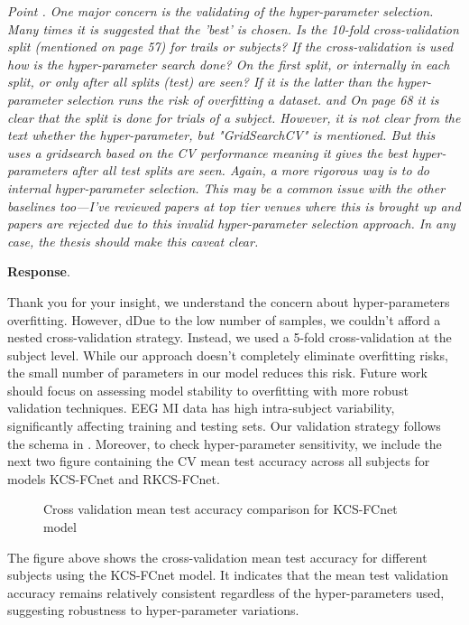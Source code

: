 \documentclass[runningheads]{llncs}
\newenvironment{reviewer}{\setcounter{pointcounter}{1}}{}
\newcommand{\point}[1]{\medskip \noindent
  \textsl{{\fontseries{b}\selectfont Point \thepointcounter}.
\stepcounter{pointcounter} #1}}
\newcommand{\reply}{\medskip \noindent \textbf{Response}.\ }
\begin{document}
\begin{reviewer}
  \point{One major concern is the validating of the hyper-parameter
    selection. Many times it is suggested that the 'best' is chosen. Is
    the 10-fold cross-validation split (mentioned on page 57) for
    trails or subjects? If the cross-validation is used how is the
    hyper-parameter search done? On the first split, or internally in
    each split, or only after all splits (test) are seen? If it is the
    latter than the hyper-parameter selection runs the risk of
    overfitting a dataset. and On page 68 it is clear that the split is
    done for trials of a subject.  However, it is not clear from the
    text whether the hyper-parameter, but "GridSearchCV" is mentioned.
    But this uses a gridsearch based on the CV performance meaning it
    gives the best hyper-parameters after all test splits are seen.
    Again, a more rigorous way is to do internal hyper-parameter
    selection. This may be a common issue with the other baselines
    too—I've reviewed papers at top tier venues where this is brought
    up and papers are rejected due to this invalid hyper-parameter
  selection approach.  In any case, the thesis should make this caveat clear.}

  \reply{Thank you for your insight, we understand the concern about
    hyper-parameters overfitting. However, dDue to the low number of
    samples, we couldn't afford a nested cross-validation strategy.
    Instead, we used a 5-fold cross-validation at the subject level.
    While our approach doesn't completely eliminate overfitting
    risks, the small number of parameters in our model reduces this
    risk. Future work should focus on assessing model stability to
    overfitting with more robust validation techniques. EEG MI data
    has high intra-subject variability, significantly affecting
    training and testing sets. Our validation strategy follows the
    schema in \cite{schirrmeister2017deep}. Moreover, to check
    hyper-parameter sensitivity, we include the next two figure
    containing the CV mean test accuracy across all subjects for
    models KCS-FCnet and RKCS-FCnet.
    \begin{figure}[h!]
      \centering
      \resizebox{\linewidth}{!}{}
      \caption{Cross validation mean test accuracy comparison for
      KCS-FCnet model}
    \end{figure}
    The figure above shows the cross-validation mean test accuracy
    for different subjects using the KCS-FCnet model. It indicates
    that the mean test validation accuracy remains relatively
    consistent regardless of the hyper-parameters used, suggesting
    robustness to hyper-parameter variations.

}
\end{reviewer}
\end{document}
